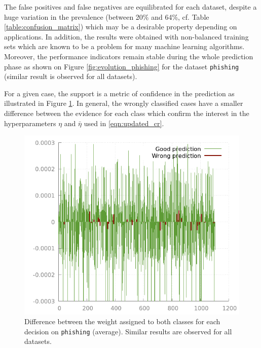 \documentclass[sigconf,edbt]{acmart-edbt-workshops}
\begin{document}
The false positives and false negatives are equilibrated for each dataset, despite a huge variation in the prevalence (between 20\% and 64\%, cf. Table \ref{table:confusion_matrix}) which may be a desirable property depending on applications. In addition, the results were obtained with non-balanced training sets which are known to be a problem for many machine learning algorithms. Moreover, the performance indicators remain stable during the whole prediction phase as shown on Figure \ref{fig:evolution_phishing} for the dataset \texttt{phishing} (similar result is observed for all datasets).

For a given case, the support is a metric of confidence in the prediction as illustrated in Figure \ref{fig:phishing_predictive_measure}. In general, the wrongly classified cases have a smaller difference between the evidence for each class which confirm the interest in the hyperparameters $\eta$ and $\bar \eta$ used in \eqref{eqn:updated_cr}.

\begin{figure}[!h]
\centering
\includegraphics[scale=0.35]{img/output_run_0_diff_pred_1.png}
\caption{Difference between the weight assigned to both classes for each decision on \texttt{phishing} (average). Similar results are observed for all datasets.}
\label{fig:phishing_predictive_measure}
\end{figure}
\end{document}
